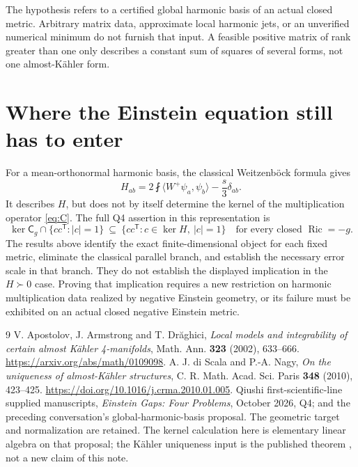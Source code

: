 \documentclass[11pt]{article}
\theoremstyle{remark}\newtheorem{remark}[proposition]{Remark}
\newcommand{\Ric}{\operatorname{Ric}}
\newcommand{\av}{\mathop{\fint}\nolimits}
\newcommand{\CC}{\mathsf C_g}
\begin{document}
The hypothesis refers to a certified global harmonic basis of an actual closed metric. Arbitrary matrix data, approximate local harmonic jets, or an unverified numerical minimum do not furnish that input. A feasible positive matrix of rank greater than one only describes a constant sum of squares of several forms, not one almost-K\"ahler form.

\section{Where the Einstein equation still has to enter}
For a mean-orthonormal harmonic basis, the classical Weitzenb\"ock formula gives
\[
 H_{ab}=2\av\langle W^+\psi_a,\psi_b\rangle-\frac{s}{3}\delta_{ab}.
\]
It describes $H$, but does not by itself determine the kernel of the multiplication operator \eqref{eq:C}. The full Q4 assertion in this representation is
\[
 \ker\CC\cap\{cc^{\mathsf T}:|c|=1\}
 \ \subseteq\ \{cc^{\mathsf T}:c\in\ker H,\ |c|=1\}
 \quad\text{for every closed }\Ric=-g.
\]
The results above identify the exact finite-dimensional object for each fixed metric, eliminate the classical parallel branch, and establish the necessary error scale in that branch. They do not establish the displayed implication in the $H\succ0$ case. Proving that implication requires a new restriction on harmonic multiplication data realized by negative Einstein geometry, or its failure must be exhibited on an actual closed negative Einstein metric.

\begin{thebibliography}{9}
 V. Apostolov, J. Armstrong and T. Dr\u aghici,
\emph{Local models and integrability of certain almost K\"ahler 4-manifolds},
Math. Ann. \textbf{323} (2002), 633--666.
\url{https://arxiv.org/abs/math/0109098}.
 A. J. di Scala and P.-A. Nagy,
\emph{On the uniqueness of almost-K\"ahler structures},
C. R. Math. Acad. Sci. Paris \textbf{348} (2010), 423--425.
\url{https://doi.org/10.1016/j.crma.2010.01.005}.
 Qiushi first-scientific-line supplied manuscripts,
\emph{Einstein Gaps: Four Problems}, October 2026, Q4; and the preceding
conversation's global-harmonic-basis proposal. The geometric target and
normalization are retained. The kernel calculation here is elementary
linear algebra on that proposal; the K\"ahler uniqueness input is the
published theorem \cite{DN}, not a new claim of this note.
\end{thebibliography}
\end{document}
